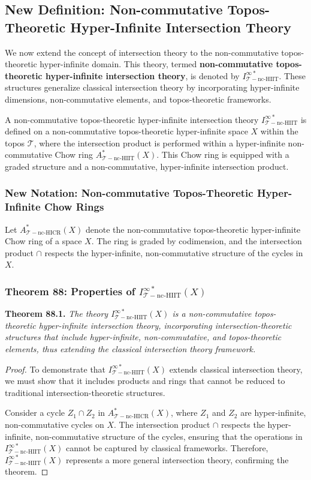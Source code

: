 \documentclass{article}
\begin{document}
\subsection{New Definition: Non-commutative Topos-Theoretic Hyper-Infinite Intersection Theory}
We now extend the concept of intersection theory to the non-commutative topos-theoretic hyper-infinite domain. This theory, termed \textbf{non-commutative topos-theoretic hyper-infinite intersection theory}, is denoted by \(I_{\mathcal{T}-\text{nc-HIIT}}^{\infty *}\). These structures generalize classical intersection theory by incorporating hyper-infinite dimensions, non-commutative elements, and topos-theoretic frameworks.

A non-commutative topos-theoretic hyper-infinite intersection theory \(I_{\mathcal{T}-\text{nc-HIIT}}^{\infty *}\) is defined on a non-commutative topos-theoretic hyper-infinite space \(X\) within the topos \(\mathcal{T}\), where the intersection product is performed within a hyper-infinite non-commutative Chow ring \(A_{\mathcal{T}-\text{nc-HIIT}}^{*}(X)\). This Chow ring is equipped with a graded structure and a non-commutative, hyper-infinite intersection product.

\subsubsection{New Notation: Non-commutative Topos-Theoretic Hyper-Infinite Chow Rings}
Let \(A_{\mathcal{T}-\text{nc-HICR}}^{*}(X)\) denote the non-commutative topos-theoretic hyper-infinite Chow ring of a space \(X\). The ring is graded by codimension, and the intersection product \(\cap\) respects the hyper-infinite, non-commutative structure of the cycles in \(X\).

\subsubsection{Theorem 88: Properties of \(I_{\mathcal{T}-\text{nc-HIIT}}^{\infty *}(X)\)}
\textbf{Theorem 88.1.} \textit{The theory \(I_{\mathcal{T}-\text{nc-HIIT}}^{\infty *}(X)\) is a non-commutative topos-theoretic hyper-infinite intersection theory, incorporating intersection-theoretic structures that include hyper-infinite, non-commutative, and topos-theoretic elements, thus extending the classical intersection theory framework.}

\begin{proof}
To demonstrate that \(I_{\mathcal{T}-\text{nc-HIIT}}^{\infty *}(X)\) extends classical intersection theory, we must show that it includes products and rings that cannot be reduced to traditional intersection-theoretic structures.

Consider a cycle \(Z_1 \cap Z_2\) in \(A_{\mathcal{T}-\text{nc-HICR}}^{*}(X)\), where \(Z_1\) and \(Z_2\) are hyper-infinite, non-commutative cycles on \(X\). The intersection product \(\cap\) respects the hyper-infinite, non-commutative structure of the cycles, ensuring that the operations in \(I_{\mathcal{T}-\text{nc-HIIT}}^{\infty *}(X)\) cannot be captured by classical frameworks. Therefore, \(I_{\mathcal{T}-\text{nc-HIIT}}^{\infty *}(X)\) represents a more general intersection theory, confirming the theorem.
\end{proof}
\end{document}
